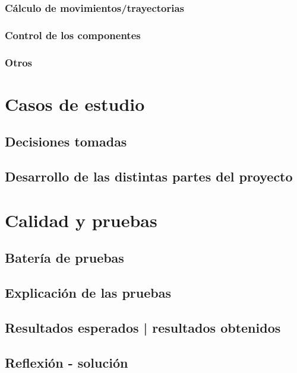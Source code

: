 \subsection{Cálculo de movimientos/trayectorias}

\subsection{Control de los componentes}

\subsection{Otros}


\chapter{Casos de estudio}

\section{Decisiones tomadas}

\section{Desarrollo de las distintas partes del proyecto}


\chapter{Calidad y pruebas}

\section{Batería de pruebas}

\section{Explicación de las pruebas}

\section{Resultados esperados | resultados obtenidos}

\section{Reflexión - solución}


